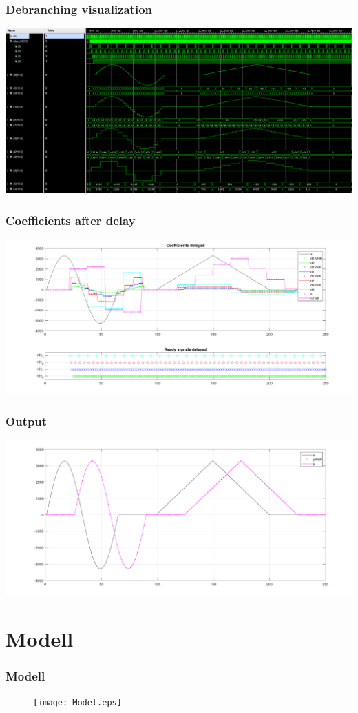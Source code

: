 \documentclass[english, aspectratio=169]{beamer}
\begin{document}
\begin{frame}
\frametitle{Debranching visualization}
\centering
\includegraphics[width=\linewidth]{inv_branching_screenshot.PNG}
\end{frame}

\begin{frame}
\frametitle{Coefficients after delay}
	\centering
	\includegraphics[scale=0.42]{coefs_delayed.pdf}
\end{frame}

\begin{frame}
\frametitle{Output}
	\centering
	\includegraphics[scale=0.42]{output.pdf}
\end{frame}


\section{Modell} 
\begin{frame}
	\frametitle{Modell}
	\begin{figure}
		\texttt{[image: Model.eps]}
	\end{figure}
\end{frame}
\end{document}
